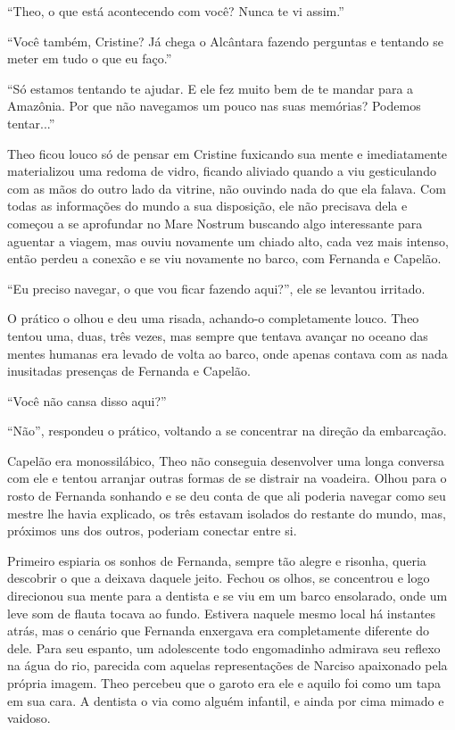 ``Theo, o que está acontecendo com você? Nunca te vi assim.''

``Você também, Cristine? Já chega o Alcântara fazendo perguntas e
tentando se meter em tudo o que eu faço.''

``Só estamos tentando te ajudar. E ele fez muito bem de te mandar para a
Amazônia. Por que não navegamos um pouco nas suas memórias? Podemos
tentar...''

Theo ficou louco só de pensar em Cristine fuxicando sua mente e
imediatamente materializou uma redoma de vidro, ficando aliviado quando
a viu gesticulando com as mãos do outro lado da vitrine, não ouvindo
nada do que ela falava. Com todas as informações do mundo a sua
disposição, ele não precisava dela e começou a se aprofundar no Mare
Nostrum buscando algo interessante para aguentar a viagem, mas ouviu
novamente um chiado alto, cada vez mais intenso, então perdeu a conexão
e se viu novamente no barco, com Fernanda e Capelão.

``Eu preciso navegar, o que vou ficar fazendo aqui?'', ele se levantou
irritado.

O prático o olhou e deu uma risada, achando-o completamente louco. Theo
tentou uma, duas, três vezes, mas sempre que tentava avançar no oceano
das mentes humanas era levado de volta ao barco, onde apenas contava com
as nada inusitadas presenças de Fernanda e Capelão.

``Você não cansa disso aqui?''

``Não'', respondeu o prático, voltando a se concentrar na direção da
embarcação.

Capelão era monossilábico, Theo não conseguia desenvolver uma longa
conversa com ele e tentou arranjar outras formas de se distrair na
voadeira. Olhou para o rosto de Fernanda sonhando e se deu conta de que
ali poderia navegar como seu mestre lhe havia explicado, os três estavam
isolados do restante do mundo, mas, próximos uns dos outros, poderiam
conectar entre si.

Primeiro espiaria os sonhos de Fernanda, sempre tão alegre e risonha,
queria descobrir o que a deixava daquele jeito. Fechou os olhos, se
concentrou e logo direcionou sua mente para a dentista e se viu em um
barco ensolarado, onde um leve som de flauta tocava ao fundo. Estivera
naquele mesmo local há instantes atrás, mas o cenário que Fernanda
enxergava era completamente diferente do dele. Para seu espanto, um
adolescente todo engomadinho admirava seu reflexo na água do rio,
parecida com aquelas representações de Narciso apaixonado pela própria
imagem. Theo percebeu que o garoto era ele e aquilo foi como um tapa em
sua cara. A dentista o via como alguém infantil, e ainda por cima mimado
e vaidoso.

